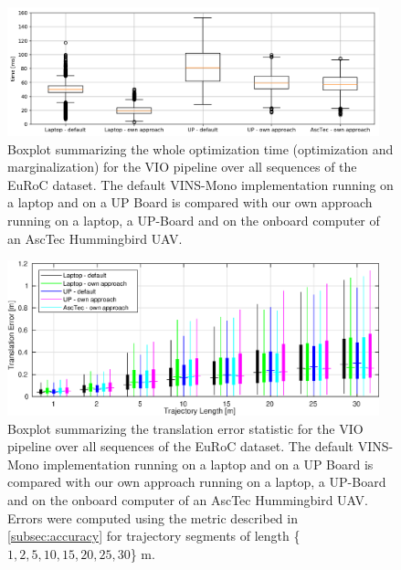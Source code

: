 \begin{minipage}[H]{1\linewidth}
\vspace{-5pt}
\begin{figure}[H]
\centering
\includegraphics[width=0.96\textwidth]{images/result_time}
\caption{Boxplot summarizing the whole optimization time (optimization and 
marginalization) for the \ac{VIO} pipeline over all sequences of the EuRoC 
dataset. The default VINS-Mono implementation running on a laptop and on a UP 
Board is compared with our own approach running on a laptop, a UP-Board and on 
the onboard computer of an AscTec Hummingbird \ac{UAV}.}
\label{fig:time_result}
\end{figure}
\vspace{-15pt}
\begin{figure}[H]
\centering
\includegraphics[width=0.96\textwidth]{images/acc_result}
\caption{Boxplot summarizing the translation error statistic for the \ac{VIO}
pipeline over all sequences of the EuRoC dataset. The default VINS-Mono 
implementation running on a laptop and on a UP Board is compared with our own 
approach running on a laptop, a UP-Board and on the onboard computer of an 
AscTec Hummingbird \ac{UAV}. Errors were computed using the metric described in 
\autoref{subsec:accuracy} for trajectory segments of length \{$1, 2, 5, 10, 15, 
20, 25, 30$\} m.}
\label{fig:acc_result}
\end{figure}
\end{minipage}


